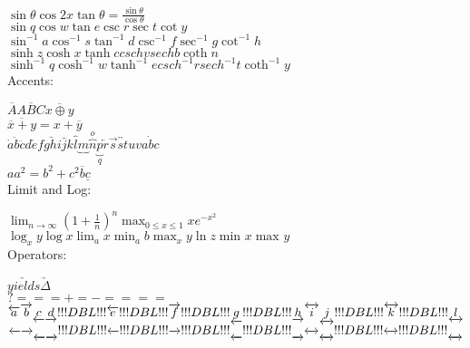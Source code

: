 \documentclass[12pt,a4paper]{article}
\begin{document}
$\sin \theta \cos 2x\tan \theta =\frac{\sin \theta }{\cos \theta }$\\


$\sin q\cos w\tan e\csc r\sec t\cot y$\\


$\sin ^{-1}a\cos ^{-1}s\tan ^{-1}d\csc ^{-1}f\sec ^{-1}g\cot ^{-1}h$
\\


$\sinh z\cosh x\tanh ccsch vsech b\coth n$\\


$\sinh ^{-1}q\cosh ^{-1}w\tanh ^{-1}ecsch ^{-1}rsech ^{-1}t\coth ^{-1}y
$\\


Accents:

$\overline{A}\overline{ABC}\overline{x\oplus y}$\\


$\overline{\overline{x}+y}=x+\overline{y}$\\


$
\dot{a}\ddot{b}\dddot{c}{d}\check{e}{f}{g}\breve{h}{i}\bar{j}{k}\overbrace{l}\underbrace{m}\overbrace{n}^{o}\underbrace{p}_{q}\overleftarrow{r}\overrightarrow{ 
s}\overleftrightarrow{s t} {u}{v}\dot{abc}$\\


$aa^{2}=b^{2}+c^{2}\overline{b}\underline{c}$\\


Limit and Log:

$\lim _{n\to \infty }(1+\frac{1}{n})^{n}\max _{0\le x\le 1}xe^{-x^{2}}
$\\


$\log _{x}y\log x\lim _{a}x\min _{a}b\max _{x}y\ln z\min _{}x\max _{}y
$\\


Operators:

$\underrightarrow{yields}\underrightarrow{\Delta }$\\


$?===+=-====$\\


$
\overleftarrow{a}\overrightarrow{b}\underleftarrow{c}\underrightarrow{d}!!!DBL!!!\overleftarrow{e}!!!DBL!!!\overrightarrow{f}!!!DBL!!!\underleftarrow{g}!!!DBL!!!\underrightarrow{h}\overleftrightarrow{i}\underleftrightarrow{j}!!!DBL!!!\overleftrightarrow{k}!!!DBL!!!\underleftrightarrow{l}
$\\


$
\overleftarrow{}\overrightarrow{}\underleftarrow{}\underrightarrow{}!!!DBL!!!\overleftarrow{}!!!DBL!!!\overrightarrow{}!!!DBL!!!\underleftarrow{}!!!DBL!!!\underrightarrow{}\overleftrightarrow{}\underleftrightarrow{}!!!DBL!!!\overleftrightarrow{}!!!DBL!!!\underleftrightarrow{}
$\\
\end{document}
